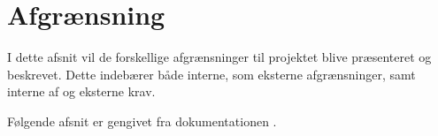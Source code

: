 \section{Afgrænsning}

I dette afsnit vil de forskellige afgrænsninger til projektet blive præsenteret og beskrevet. Dette indebærer både interne, som eksterne afgrænsninger, samt interne af og eksterne krav.

Følgende afsnit er gengivet fra dokumentationen \cite{issue-statement}.